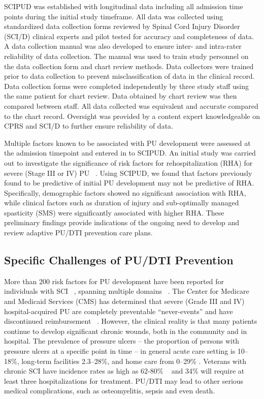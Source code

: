 \documentclass{amia}
\begin{document}
SCIPUD was established with longitudinal data including all admission time points during the initial study timeframe. All data was collected using standardized data collection forms reviewed by Spinal Cord Injury Disorder (SCI/D) clinical experts and pilot tested for accuracy and completeness of data. A data collection manual was also developed to ensure inter- and intra-rater reliability of data collection. The manual was used to train study personnel on the data collection form and chart review methods. Data collectors were trained prior to data collection to prevent misclassification of data in the clinical record. Data collection forms were completed independently by three study staff using the same patient for chart review. Data obtained by chart review was then compared between staff. All data collected was equivalent and accurate compared to the chart record. Oversight was provided by a content expert knowledgeable on CPRS and SCI/D to further ensure reliability of data.

Multiple factors known to be associated with PU development were assessed at the admission timepoint and entered in to SCIPUD. An initial study was carried out to investigate the significance of risk factors for rehospitalization (RHA) for severe (Stage III or IV) PU ~\cite{stages}. Using SCIPUD, we found that factors previously found to be predictive of initial PU development may not be predictive of RHA. Specifically, demographic factors showed no significant association with RHA, while clinical factors such as duration of injury and sub-optimally managed spasticity (SMS) were significantly associated with higher RHA. These preliminary findings provide indications of the ongoing need to develop and review adaptive PU/DTI prevention care plans.

\subsection{Specific Challenges of PU/DTI Prevention}

More than 200 risk factors for PU development have been reported for individuals with SCI ~\cite{risk-factors-number}, spanning multiple domains ~\cite{risk-factors-domain}. The Center for Medicare and Medicaid Services (CMS) has determined that severe (Grade III and IV) hospital-acquired PU are completely preventable ``never-events'' and have discontinued reimbursement ~\cite{never-event}. However, the clinical reality is that many patients continue to develop significant chronic wounds, both in the community and in hospital. The prevalence of pressure ulcers – the proportion of persons with pressure ulcers at a specific point in time – in general acute care setting is 10–18\%, long-term facilities 2.3–28\%, and home care from 0–29\% \cite{ac-rate-ir, ac-rate-pr}. Veterans with chronic SCI have incidence rates as high as 62-80\% ~\cite{va-pr-up, va-pr-bot} and 34\% will require at least three hospitalizations for treatment. PU/DTI may lead to other serious medical complications, such as osteomyelitis, sepsis and even death.
\end{document}
